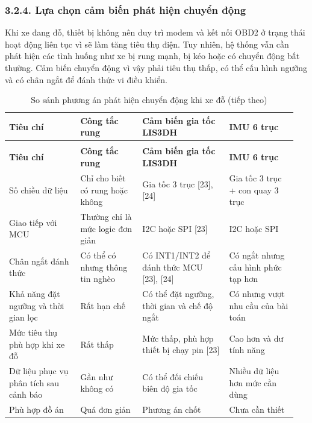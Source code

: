 \documentclass[a4paper]{extarticle}
\newcommand{\thesisterm}[1]{{\rmfamily #1}}
\newcommand{\thesissettableid}[2]{%
  \renewcommand{\thetable}{#1}%
  \renewcommand{\theHtable}{#2}%
}
\begin{document}
\subsubsection{3.2.4. Lựa chọn cảm biến phát hiện chuyển động}\label{lux1ef1a-chux1ecdn-cux1ea3m-biux1ebfn-phuxe1t-hiux1ec7n-chuyux1ec3n-ux111ux1ed9ng}

Khi xe đang đỗ, thiết bị không nên duy trì modem và kết nối OBD2 ở trạng thái hoạt động liên tục vì sẽ làm tăng tiêu thụ điện. Tuy nhiên, hệ thống vẫn cần phát hiện các tình huống như xe bị rung mạnh, bị kéo hoặc có chuyển động bất thường. Cảm biến chuyển động vì vậy phải tiêu thụ thấp, có thể cấu hình ngưỡng và có chân ngắt để đánh thức vi điều khiển.

{\thesissettableid{3.9}{condensed-bang-3-9-so-sanh-phuong-an-phat-hien-chuyen-dong-khi-xe-do}
\def\LTcaptype{table}
\begin{longtable}{|L{0.238\linewidth}|L{0.207\linewidth}|L{0.284\linewidth}|L{0.222\linewidth}|}
\caption{So sánh phương án phát hiện chuyển động khi xe đỗ}\label{tab:condensed-bang-3-9-so-sanh-phuong-an-phat-hien-chuyen-dong-khi-xe-do}\\
\hline
\textbf{Tiêu chí} & \textbf{Công tắc rung} & \textbf{Cảm biến gia tốc LIS3DH} & \textbf{IMU 6 trục} \\
\hline
\endfirsthead
\caption[]{So sánh phương án phát hiện chuyển động khi xe đỗ (tiếp theo)}\\
\hline
\textbf{Tiêu chí} & \textbf{Công tắc rung} & \textbf{Cảm biến gia tốc LIS3DH} & \textbf{IMU 6 trục} \\
\hline
\endhead
\endfoot
\endlastfoot
Số chiều dữ liệu & Chỉ cho biết có rung hoặc không & Gia tốc 3 trục {[}23{]}, {[}24{]} & Gia tốc 3 trục + con quay 3 trục \\\hline
Giao tiếp với MCU & Thường chỉ là mức logic đơn giản & I2C hoặc SPI {[}23{]} & I2C hoặc SPI \\\hline
Chân ngắt đánh thức & Có thể có nhưng thông tin nghèo & Có \thesisterm{INT1/INT2} để đánh thức MCU {[}23{]}, {[}24{]} & Có ngắt nhưng cấu hình phức tạp hơn \\\hline
Khả năng đặt ngưỡng và thời gian lọc & Rất hạn chế & Có thể đặt ngưỡng, thời gian và chế độ ngắt & Có nhưng vượt nhu cầu của bài toán \\\hline
Mức tiêu thụ phù hợp khi xe đỗ & Rất thấp & Mức thấp, phù hợp thiết bị chạy pin {[}23{]} & Cao hơn và dư tính năng \\\hline
Dữ liệu phục vụ phân tích sau cảnh báo & Gần như không có & Có thể đối chiếu biên độ gia tốc & Nhiều dữ liệu hơn mức cần dùng \\\hline
Phù hợp đồ án & Quá đơn giản & Phương án chốt & Chưa cần thiết \\\hline
\end{longtable}
}
\end{document}
